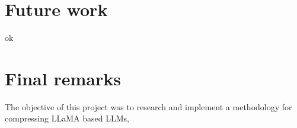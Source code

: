 \section{Future work}
ok
\section{Final remarks}
The objective of this project was to research and implement a methodology for compressing LLaMA based LLMs, 